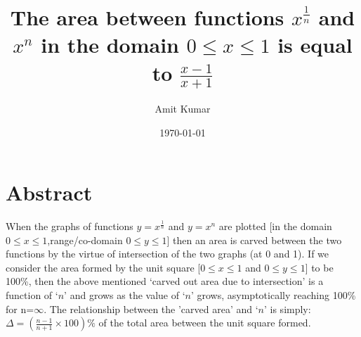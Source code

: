 \documentclass[10pt, twoside]{article}
\title{The area between functions $x^{\frac{1}{n}}$ and $x^n$ in the domain $0 \le x \le 1$ is equal to $\frac{x-1}{x+1}$}
\author{Amit Kumar}
\date{\today}
\begin{document}
\maketitle
\section{Abstract}
When the graphs of functions $y=x^{\frac{1}{n}}$ and $y=x^n$ are plotted [in the domain $0 \le x \le 1$,range/co-domain $0 \le y \le 1$] then an area is carved between the two functions by the virtue of intersection of the two graphs (at 0 and 1). If we consider the area formed by the unit square [$0 \le x \le 1$ and $0 \le y \le 1$] to be 100\%, then the above mentioned `carved out area due to intersection' is a function of `$n$' and grows as the value of `$n$' grows, asymptotically reaching 100\% for n=$\infty$. The relationship between the 'carved area' and `$n$' is simply: $\Delta = (\frac{n-1}{n+1}\times{100})\%$ of the total area between the unit square formed.
\end{document}
